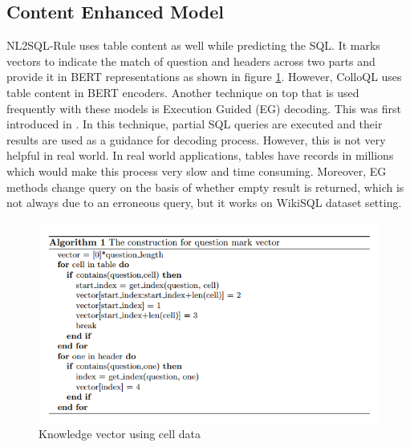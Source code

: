 \documentclass[12pt]{article}
\begin{document}
\subsection{Content Enhanced Model}
NL2SQL-Rule \cite{guo2019content} uses table content as well while predicting the SQL. It marks vectors to indicate the match of question and headers across two parts and provide it in BERT representations as shown in figure \ref{cellfeature}. However, ColloQL uses table content in BERT encoders. Another technique on top that is used frequently with these models is Execution Guided (EG) decoding. This was first introduced in \cite{wang2018robust}. In this technique, partial SQL queries are executed and their results are used as a guidance for decoding process. However, this is not very helpful in real world. In real world applications, tables have records in millions which would make this process very slow and time consuming. Moreover, EG methods change query on the basis of whether empty result is returned, which is not always due to an erroneous query, but it works on WikiSQL dataset setting. \\
\begin{figure}[H]
    \includegraphics[width=400pt]{cellfeature}
    \caption{Knowledge vector using cell data}
    \label{cellfeature}
\end{figure}
\end{document}
